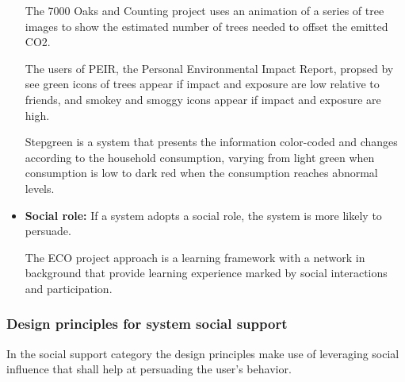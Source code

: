 \begin{itemize}
	The 7000 Oaks and Counting project \cite{holmes2007eco} uses an animation of a series of tree images to show the estimated number of trees needed to offset the emitted CO2.
	
	The users of PEIR, the Personal Environmental Impact Report, propsed by \cite{mun2009peir} see green icons of trees appear if impact and exposure are low relative to friends, and smokey and smoggy icons
	appear if impact and exposure are high.
	
	Stepgreen \cite{pereira2012design} is a system that presents the information color-coded and changes according to the household
	consumption, varying from light green when consumption is low to dark red when the consumption reaches abnormal levels.
	
	\item \textbf{Social role:}
	If a system adopts a social	role, the system is more likely to persuade.

	The ECO project approach is a learning framework with a network in background that \cite{brouns2014networked} provide learning experience marked by social interactions and participation.
	
	 
\end{itemize}

\subsubsection{Design principles for system social support}

In the social support category the design principles make use of leveraging social influence that shall help at persuading the user's behavior.

